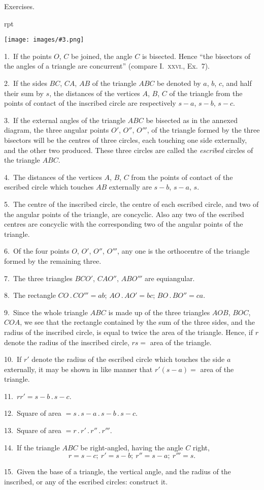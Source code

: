 \documentclass[oneside]{book}
\newcounter{wrapwidth}
\newcommand\exheadin[1]{
\par\medskip\Needspace*{4\baselineskip}
\hspace{1.5\parindent}\textsf{#1}\par\medskip
}
\newcommand\imgflow[3]{
\setcounter{wrapwidth}{#1}
\begin{wrapfigure}[#2]{r}{\value{wrapwidth}pt}
\begin{center}
\vspace{-0.3in}
\texttt{[image: images/\#3.png]}
\end{center}
\end{wrapfigure}
}
\begin{document}
\exheadin{Exercises.}

\imgflow{155}{19}{f155}

\begin{footnotesize}
1.~If the points $O$, $C$ be joined, the angle $C$ is bisected.
Hence ``the bisectors of the angles of a triangle are concurrent''
(compare I.~\textsc{xxvi.}, Ex.~7).

2.~If the sides $BC$, $CA$, $AB$ of the triangle $ABC$ be denoted by
$a$, $b$, $c$, and half their sum by $s$, the distances of the vertices
$A$, $B$, $C$ of the triangle from the points of contact of the inscribed
circle are respectively $s-a$, $s-b$, $s-c$.


3.~If the external angles of the triangle $ABC$ be bisected as in
the annexed diagram, the three
angular points $O'$, $O''$, $O'''$, of
the triangle formed by the three
bisectors will be the centres of
three circles, each touching one
side externally, and the other
two produced. These three
circles are called the \emph{escribed}
circles of the triangle $ABC$.

4.~The distances of the vertices
$A$, $B$, $C$ from the points
of contact of the escribed circle
which touches $AB$ externally
are $s-b$, $s-a$, $s$.

5.~The centre of the inscribed
circle, the centre of each
escribed circle, and two of the
angular points of the triangle,
are concyclic. Also any two of the escribed centres are concyclic
with the corresponding two of the angular points of the triangle.

6.~Of the four points $O$, $O'$, $O''$, $O'''$, any one is the orthocentre
of the triangle formed by the remaining three.

7.~The three triangles $BCO'$, $CAO''$, $ABO'''$ are equiangular.

8.~The rectangle $CO\,.\,CO''' = ab$; $AO\,.\,AO' = bc$; $BO\,.\,BO''
= ca$.

9.~Since the whole triangle $ABC$ is made up of the three triangles
$AOB$, $BOC$, $COA$, we see that the rectangle contained by
the sum of the three sides, and the radius of the inscribed circle,
is equal to twice the area of the triangle. Hence, if $r$ denote the
radius of the inscribed circle, $rs =$ area of the triangle.

10.~If $r'$ denote the radius of the escribed circle which touches
the side $a$ externally, it may be shown in like manner that
$r'(s-a) =$ area of the triangle.

11.~$rr' = s-b\,.\,s-c$.

12.~Square of area $= s\,.\,s-a\,.\,s-b\,.\,s-c$.

13.~Square of area $= r\,.\,r'\,.\,r''\,.\,r'''$.

14.~If the triangle $ABC$ be right-angled, having the angle $C$
right,
\[
r = s-c;\ r' = s-b;\ r'' = s-a;\ r''' = s.
\]

15.~Given the base of a triangle, the vertical angle, and the
radius of the inscribed, or any of the escribed circles: construct
it.
\par\end{footnotesize}
\end{document}
